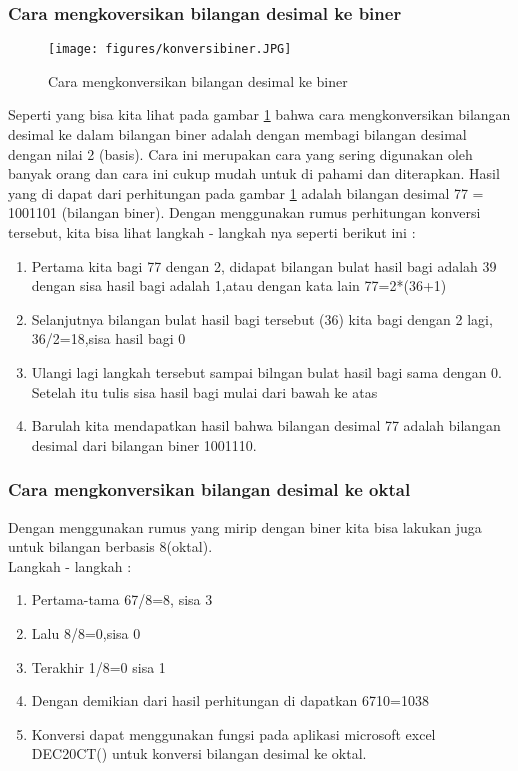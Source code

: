 \subsubsection{Cara mengkoversikan bilangan desimal ke biner}
\begin{figure}[ht]
\centerline{\texttt{[image: figures/konversibiner.JPG]}}
\caption{Cara mengkonversikan bilangan desimal ke biner}
\label{konversibiner}
\end{figure}
Seperti yang bisa kita lihat pada gambar \ref{konversibiner} bahwa cara mengkonversikan bilangan desimal ke dalam bilangan biner adalah dengan membagi bilangan desimal dengan nilai 2 (basis). Cara ini merupakan cara yang sering digunakan oleh banyak orang dan cara ini cukup mudah untuk di pahami dan diterapkan. Hasil yang di dapat dari perhitungan pada gambar \ref{konversibiner} adalah bilangan desimal 77 = 1001101 (bilangan biner). Dengan menggunakan rumus perhitungan konversi tersebut, kita bisa lihat langkah - langkah nya seperti berikut ini : 
\begin{enumerate}
\item Pertama kita bagi 77 dengan 2, didapat bilangan bulat hasil bagi adalah 39 dengan sisa hasil bagi adalah 1,atau dengan kata lain 77=2*(36+1)
\item Selanjutnya bilangan bulat hasil bagi tersebut (36) kita bagi dengan 2 lagi, 36/2=18,sisa hasil bagi 0
\item Ulangi lagi langkah tersebut sampai bilngan bulat hasil bagi sama dengan 0. Setelah itu tulis sisa hasil bagi mulai dari bawah ke atas
\item Barulah kita mendapatkan hasil bahwa bilangan desimal 77 adalah bilangan desimal dari bilangan biner 1001110.
\end{enumerate}

\subsubsection{Cara mengkonversikan bilangan desimal ke oktal}
Dengan menggunakan rumus yang mirip dengan biner kita bisa lakukan juga untuk bilangan berbasis 8(oktal).
\\Langkah - langkah :
\begin{enumerate}
\item Pertama-tama 67/8=8, sisa 3
\item Lalu 8/8=0,sisa 0
\item Terakhir 1/8=0 sisa 1
\item Dengan demikian dari hasil perhitungan di dapatkan 6710=1038
\item Konversi dapat menggunakan fungsi pada aplikasi microsoft excel DEC20CT() untuk konversi bilangan desimal ke oktal.
\end{enumerate}

